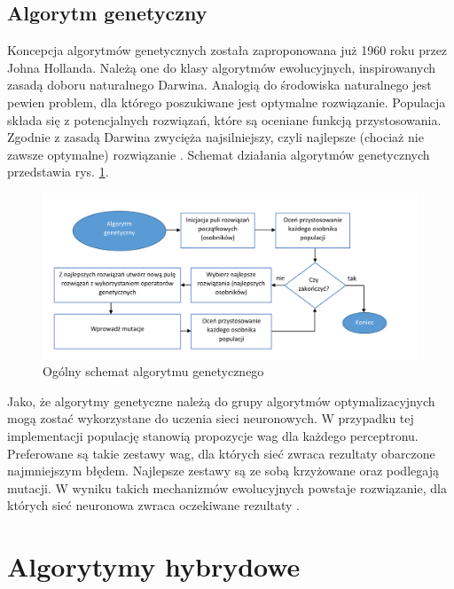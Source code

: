 \documentclass[twoside]{iisthesis}
\begin{document}
 		 \subsection{Algorytm genetyczny}	
		 
		 Koncepcja algorytmów genetycznych została zaproponowana już 1960 roku przez Johna Hollanda. Należą one do klasy algorytmów ewolucyjnych, inspirowanych zasadą doboru naturalnego Darwina. Analogią do środowiska naturalnego jest pewien problem, dla którego poszukiwane jest optymalne rozwiązanie. Populacja składa się z potencjalnych rozwiązań, które są oceniane funkcją przystosowania. Zgodnie z zasadą Darwina zwycięża najsilniejszy, czyli najlepsze (chociaż nie zawsze optymalne) rozwiązanie \cite{pena2000evolutionary}. Schemat działania algorytmów genetycznych przedstawia rys. \ref{fig:algorytmgenetyczny}.	 
		 
		 
		 \begin{figure}[!ht] 
		 	\centering
		 	\includegraphics[width=1\textwidth]{algorytmgenetyczny}
		 	\caption{Ogólny schemat algorytmu genetycznego}
		 	\label{fig:algorytmgenetyczny}
		 \end{figure}

		 Jako, że algorytmy genetyczne należą do grupy algorytmów optymalizacyjnych mogą zostać wykorzystane do uczenia sieci neuronowych. W przypadku tej implementacji populację stanowią propozycje wag dla każdego perceptronu. Preferowane są takie zestawy wag, dla których sieć zwraca rezultaty obarczone najmniejszym błędem. Najlepsze zestawy są ze sobą krzyżowane oraz podlegają mutacji. W wyniku takich mechanizmów ewolucyjnych powstaje rozwiązanie, dla których sieć neuronowa zwraca oczekiwane rezultaty \cite{aforgenetgenetic}\cite{montana1989training}.
		 
		 
	 \section{Algorytymy hybrydowe}
	 
\end{document}
